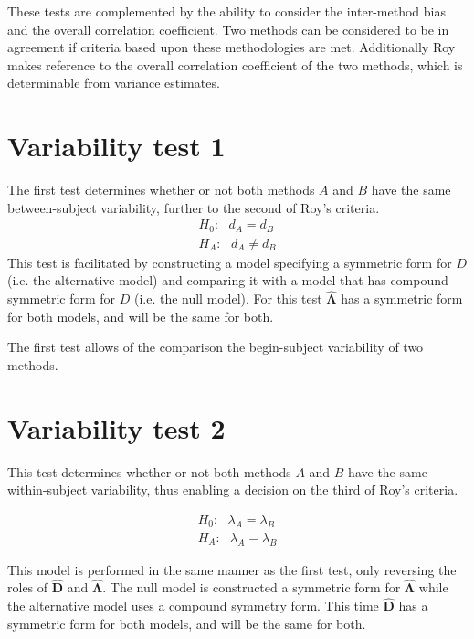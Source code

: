 \documentclass[12pt, a4paper]{report}
\theoremstyle{plain}
\theoremstyle{definition}
\theoremstyle{remark}
\begin{document}
	
	These tests are complemented by the ability to consider the inter-method bias and the overall correlation coefficient.
	Two methods can be considered to be in agreement if criteria based upon these methodologies are met. Additionally Roy makes reference to the overall correlation coefficient of the two methods, which is determinable from variance estimates.
	
	
	
	
	
	
	\section{Variability test 1}
	The first test determines whether or not both methods $A$ and $B$ have the same between-subject variability, further to the second of Roy's criteria.
	\begin{eqnarray*}
		H_{0}: \mbox{ }d_{A}  = d_{B} \\
		H_{A}: \mbox{ }d_{A}  \neq d_{B}
	\end{eqnarray*}
	This test is facilitated by constructing a model specifying a symmetric form for $D$ (i.e. the alternative model) and comparing it with a model that has compound symmetric form for $D$ (i.e. the null model). For this test $\boldsymbol{\hat{\Lambda}}$ has a symmetric form for both models, and will be the same for both.
	
	The first test allows of the comparison the begin-subject variability of two methods. 
	
	
	\section{Variability test 2}
	
	This test determines whether or not both methods $A$ and $B$ have the same within-subject variability, thus enabling a decision on the third of Roy's criteria.
	
	\begin{eqnarray*}
		H_{0}: \mbox{ }\lambda_{A}  = \lambda_{B} \\
		H_{A}: \mbox{ }\lambda_{A}  = \lambda_{B}
	\end{eqnarray*}
	
	This model is performed in the same manner as the first test, only reversing the roles of $\boldsymbol{\hat{D}}$ and $\boldsymbol{\hat{\Lambda}}$. The null model is constructed a symmetric form for $\boldsymbol{\hat{\Lambda}}$ while the alternative model uses a compound symmetry form. This time $\boldsymbol{\hat{D}}$ has a symmetric form for both models, and will be the same for both.
	
\end{document}
